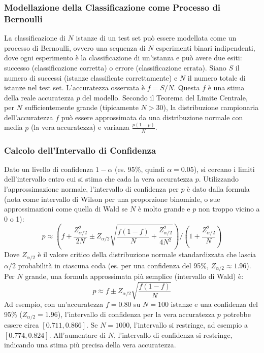 \documentclass{article}
\begin{document}
\subsubsection{Modellazione della Classificazione come Processo di Bernoulli}
La classificazione di $N$ istanze di un test set può essere modellata come un processo di Bernoulli, ovvero una sequenza di $N$ esperimenti binari indipendenti, dove ogni esperimento è la classificazione di un'istanza e può avere due esiti: successo (classificazione corretta) o errore (classificazione errata).
Siano $S$ il numero di successi (istanze classificate correttamente) e $N$ il numero totale di istanze nel test set. L'accuratezza osservata è $f = S/N$.  Questa $f$ è una stima della reale accuratezza $p$ del modello.
Secondo il Teorema del Limite Centrale, per $N$ sufficientemente grande (tipicamente $N > 30$), la distribuzione campionaria dell'accuratezza $f$ può essere approssimata da una distribuzione normale con media $p$ (la vera accuratezza) e varianza $\frac{p(1-p)}{N}$.

\subsubsection{Calcolo dell'Intervallo di Confidenza}
Dato un livello di confidenza $1-\alpha$ (es. 95\%, quindi $\alpha=0.05$), si cercano i limiti dell'intervallo entro cui si stima che cada la vera accuratezza $p$. Utilizzando l'approssimazione normale, l'intervallo di confidenza per $p$ è dato dalla formula (nota come intervallo di Wilson per una proporzione binomiale, o sue approssimazioni come quella di Wald se $N$ è molto grande e $p$ non troppo vicino a 0 o 1):
$$ p \approx \left( f + \frac{Z_{\alpha/2}^2}{2N} \pm Z_{\alpha/2} \sqrt{\frac{f(1-f)}{N} + \frac{Z_{\alpha/2}^2}{4N^2}} \right) / \left( 1 + \frac{Z_{\alpha/2}^2}{N} \right) $$
Dove $Z_{\alpha/2}$ è il valore critico della distribuzione normale standardizzata che lascia $\alpha/2$ probabilità in ciascuna coda (es. per una confidenza del 95\%, $Z_{\alpha/2} \approx 1.96$).
Per $N$ grande, una formula approssimata più semplice (intervallo di Wald) è:
$$ p \approx f \pm Z_{\alpha/2} \sqrt{\frac{f(1-f)}{N}} $$
Ad esempio, con un'accuratezza $f=0.80$ su $N=100$ istanze e una confidenza del 95\% ($Z_{\alpha/2}=1.96$), l'intervallo di confidenza per la vera accuratezza $p$ potrebbe essere circa $[0.711, 0.866]$. Se $N=1000$, l'intervallo si restringe, ad esempio a $[0.774, 0.824]$.  All'aumentare di $N$, l'intervallo di confidenza si restringe, indicando una stima più precisa della vera accuratezza.
\end{document}
